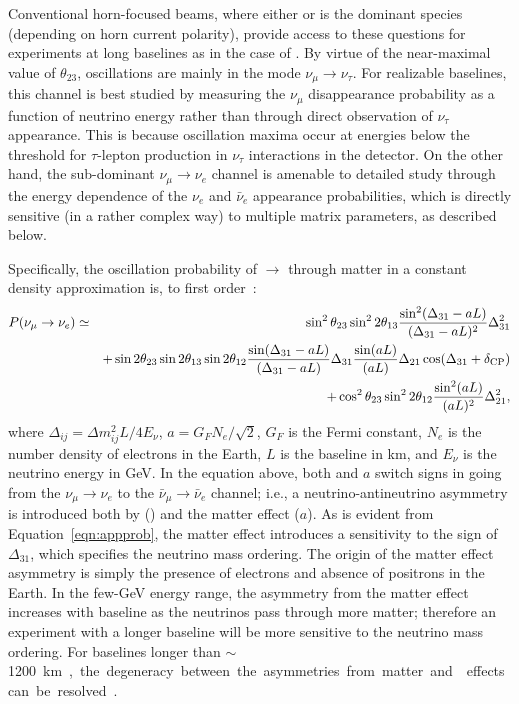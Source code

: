 Conventional horn-focused beams, where either \numu or \anumu 
is the dominant species (depending on horn current polarity), provide 
access to these questions for experiments at long baselines as in the case 
of .  By virtue 
of the near-maximal value of $\theta_{23}$, oscillations are mainly in the  
mode $\nu_\mu \rightarrow \nu_\tau$.  For realizable baselines, 
this channel is best studied by 
measuring the $\nu_\mu$ disappearance probability as a function of 
neutrino energy rather than through direct observation of $\nu_\tau$ 
appearance.  This is because oscillation maxima occur at energies 
below the threshold for $\tau$-lepton production in $\nu_\tau$ 
 interactions in the detector.
On the other hand, the sub-dominant $\nu_\mu \rightarrow \nu_e$ channel is 
amenable to detailed study through the energy dependence of the
$\nu_e$ and $\bar\nu_e$ appearance probabilities, 
which is directly sensitive (in a rather complex way) to 
multiple  matrix parameters, as described below.  

Specifically, the oscillation probability of \numu $\rightarrow$ \nue 
through matter in a constant density approximation is,  %
to first order~\cite{Nunokawa:2007qh}:
%
\begin{eqnarray}
P(\nu_\mu \rightarrow \nu_e) & \simeq & \sin^2 \theta_{23} \sin^2 2 \theta_{13} 
\frac{ \sin^2(\Delta_{31} - aL)}{(\Delta_{31}-aL)^2} \Delta_{31}^2 \nonumber \\
& & + \sin 2 \theta_{23} \sin 2 \theta_{13} \sin 2 \theta_{12} \frac{ \sin(\Delta_{31} - aL)}{(\Delta_{31}-aL)} \Delta_{31} \frac{\sin(aL)}{(aL)} \Delta_{21} \cos (\Delta_{31} + \delta_{\rm CP}) \nonumber\\
& & + \cos^2 \theta_{23} \sin^2 2 \theta_{12} \frac {\sin^2(aL)}{(aL)^2} \Delta_{21}^2, 
\label{eqn:appprob}
\end{eqnarray}
where $\Delta_{ij} = \Delta m^2_{ij} L/4E_\nu$, $a = G_FN_e/\sqrt{2}$, $G_F$ is the Fermi constant, $N_e$ is the number density of electrons in the Earth, $L$ is the baseline in km, and $E_\nu$ is the neutrino energy in GeV. 
In the equation above, both \deltacp and $a$ 
switch signs in going from the
$\nu_\mu \to \nu_e$ to the $\bar{\nu}_\mu \to \bar{\nu}_e$ channel; i.e.,
a neutrino-antineutrino asymmetry is introduced both by  (\deltacp)
and the matter effect ($a$). As is evident from Equation~\ref{eqn:appprob}, 
the matter effect introduces a sensitivity to the sign of $\Delta_{31}$, 
which specifies the neutrino mass ordering.
The origin of the matter effect asymmetry 
is simply the presence of electrons and absence of positrons in the Earth.  
In the few-GeV energy range, the asymmetry from the matter effect increases 
with baseline as the neutrinos
pass through more matter; therefore an experiment with a longer baseline will be
more sensitive to the neutrino mass ordering. For baselines longer than 
$\sim$\SI{1200}\km, the degeneracy between the asymmetries from matter
and  effects can be resolved~\cite{Bass:2013vcg}.

